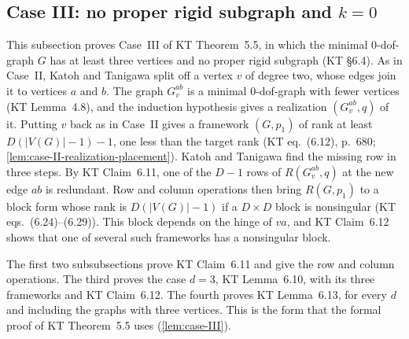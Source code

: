 \subsection{Case III: no proper rigid subgraph and \texorpdfstring{$k = 0$}{k = 0}}
\label{sec:molecular-algebraic-induction-caseIII}

This subsection proves Case~III of KT Theorem~5.5, in which the minimal
$0$-dof-graph $G$ has at least three vertices and no proper rigid
subgraph (KT \S6.4). As in Case~II, Katoh and Tanigawa split off a
vertex $v$ of degree two, whose edges join it to vertices $a$ and $b$.
The graph $G_v^{ab}$ is a minimal $0$-dof-graph with fewer vertices
(KT Lemma~4.8), and the induction hypothesis gives a realization
$(G_v^{ab}, q)$ of it. Putting $v$
back as in Case~II gives a framework $(G, p_1)$ of rank at least
$D(|V(G)| - 1) - 1$, one less than the target rank (KT eq.~(6.12),
p.~680; \cref{lem:case-II-realization-placement}). Katoh and
Tanigawa find the missing row in three steps. By KT Claim~6.11, one of
the $D - 1$ rows of $R(G_v^{ab}, q)$ at the new edge $ab$ is redundant.
Row and column operations then bring $R(G, p_1)$ to a block form whose
rank is $D(|V(G)| - 1)$ if a $D \times D$ block is nonsingular (KT
eqs.~(6.24)--(6.29)). This block depends on the hinge of $va$, and KT
Claim~6.12 shows that one of several such frameworks has a nonsingular
block.

The first two subsubsections prove KT Claim~6.11 and give the row and
column operations. The third proves the case $d = 3$, KT Lemma~6.10,
with its three frameworks and KT Claim~6.12. The fourth proves KT
Lemma~6.13, for every $d$ and including the graphs with three vertices.
This is the form that the formal proof of KT Theorem~5.5 uses
(\cref{lem:case-III}).

